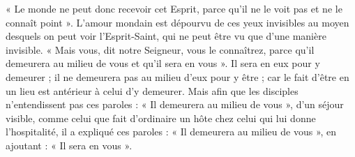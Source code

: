 « Le monde ne peut donc recevoir cet Esprit, parce qu’il ne le voit pas et ne le connaît point ». L’amour mondain est dépourvu de ces yeux invisibles au moyen desquels on peut voir l’Esprit-Saint, qui ne peut être vu que d’une manière invisible. « Mais vous, dit notre Seigneur, vous le connaîtrez, parce qu’il demeurera au milieu de vous et qu’il sera en vous ». Il sera en eux pour y demeurer ; il ne demeurera pas au milieu d’eux pour y être ; car le fait d’être en un lieu est antérieur à celui d’y demeurer. Mais afin que les disciples n’entendissent pas ces paroles : « Il demeurera au milieu de vous », d’un séjour visible, comme celui que fait d’ordinaire un hôte chez celui qui lui donne l’hospitalité, il a expliqué ces paroles : « Il demeurera au milieu de vous », en ajoutant : « Il sera en vous ».